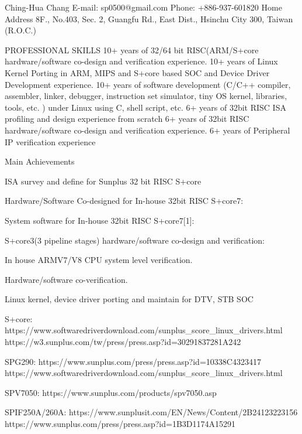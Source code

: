 
Ching-Hua Chang
E-mail: sp0500@gmail.com
Phone: +886-937-601820
Home Address
8F., No.403, Sec. 2, Guangfu Rd., East Dist., Hsinchu City 300, Taiwan (R.O.C.)




PROFESSIONAL SKILLS
10+ years of 32/64 bit RISC(ARM/S+core hardware/software co-design and verification experience.
10+ years of Linux Kernel Porting in ARM, MIPS and S+core based SOC and Device Driver Development experience.
10+ years of software development (C/C++ compiler, assembler, linker, debugger, instruction set simulator, tiny OS kernel, libraries, tools, etc. ) under Linux using C, shell script, etc.
6+ years of 32bit RISC ISA profiling and design experience from scratch
6+ years of 32bit RISC hardware/software co-design and verification experience.
6+ years of Peripheral IP verification experience



Main Achievements

ISA survey and define for Sunplus 32 bit RISC S+core

Hardware/Software Co-designed for In-house 32bit RISC S+core7:

System software for In-house 32bit RISC S+core7[1]:

S+core3(3 pipeline stages) hardware/software co-design and verification:

In house ARMV7/V8 CPU system level verification.

Hardware/software co-verification.

Linux kernel, device driver porting and maintain for DTV, STB SOC


S+core:
https://www.softwaredriverdownload.com/sunplus_score_linux_drivers.html
https://w3.sunplus.com/tw/press/press.asp?id=30291837281A242



SPG290:
https://www.sunplus.com/press/press.asp?id=10338C4323417
https://www.softwaredriverdownload.com/sunplus_score_linux_drivers.html

SPV7050:
https://www.sunplus.com/products/spv7050.asp

SPIF250A/260A:
https://www.sunplusit.com/EN/News/Content/2B24123223156
https://www.sunplus.com/press/press.asp?id=1B3D1174A15291
